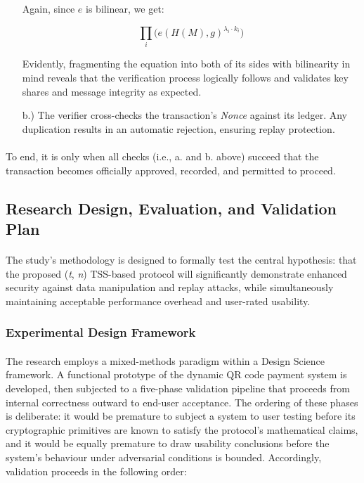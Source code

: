 \documentclass[a4paper]{scl-article}
\begin{document}
\begin{enumerate}
    Again, since $e$ is bilinear, we get:
    
    \[
    \prod_i \Big(e(H(M), g)^{\lambda_i \cdot k_i}\Big)
    \]
    
    Evidently, fragmenting the equation into both of its sides with bilinearity in mind reveals that the verification process logically follows and validates key shares and message integrity as expected.

    \item[b.)]The verifier cross-checks the transaction’s \textit{Nonce} against its ledger. Any duplication results in an automatic rejection, ensuring replay protection.
\end{enumerate}

\paragraph{}To end, it is only when all checks (i.e., a. and b. above) succeed that the transaction becomes officially approved, recorded, and permitted to proceed. 


\subsection{Research Design, Evaluation, and Validation Plan}
\label{sect:meth4}

\paragraph{}The study's methodology is designed to formally test the central hypothesis: that the proposed (\textit{t}, \textit{n}) TSS-based protocol will significantly demonstrate enhanced security against data manipulation and replay attacks, while simultaneously maintaining acceptable performance overhead and user-rated usability.

\subsubsection{Experimental Design Framework}
\label{sect:meth4_a}
\paragraph{}The research employs a mixed-methods paradigm within a Design Science framework. A functional prototype of the dynamic QR code payment system is developed, then subjected to a five-phase validation pipeline that proceeds from internal correctness outward to end-user acceptance. The ordering of these phases is deliberate: it would be premature to subject a system to user testing before its cryptographic primitives are known to satisfy the protocol's mathematical claims, and it would be equally premature to draw usability conclusions before the system's behaviour under adversarial conditions is bounded. Accordingly, validation proceeds in the following order:
\end{document}

